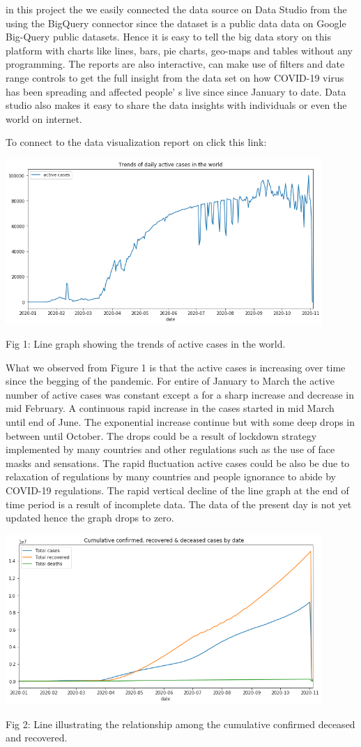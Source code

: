 \documentclass[12pt]{article}
\begin{document}
 in this project the we easily connected the data source on Data Studio from the using the BigQuery connector since the dataset is a public data data on Google Big-Query public datasets. Hence it is easy to tell the big data story on this platform with charts like lines, bars, pie charts, geo-maps and tables without any programming. The reports are also interactive, can make use of filters and date range controls to get the full insight from the data set on how COVID-19 virus has been spreading  and affected people' s live since since January to date. Data studio also makes it easy to share the data insights with individuals  or even the world on internet. 
 
 To connect to the data visualization report on click this link:
 
 
\includegraphics[width=0.9\textwidth,inner]{activecases.png}
\caption{Fig 1: Line graph showing the trends of active cases in the world.}

What we observed  from Figure 1 is that the active cases is increasing over time since the begging of the pandemic. For entire of January to March the active number of active cases was constant except a for a sharp increase and decrease in mid February. A continuous rapid increase in the cases started in mid March  until end of June. The exponential increase continue but with some deep drops in between until October.  The drops could be a result of lockdown strategy implemented by many countries and other regulations such as the use of face masks and sensations. The  rapid  fluctuation  active cases could be also be due to relaxation of regulations by many countries and people ignorance to abide by COVID-19 regulations. The rapid vertical decline of the line graph at the end of time period is a result of incomplete data. The data of the present day is not yet updated hence the graph drops to zero. 


\includegraphics[width=0.9\textwidth, inner]{line2.png}
\caption{Fig 2: Line illustrating the relationship among the cumulative confirmed deceased and recovered.}
\end{document}
